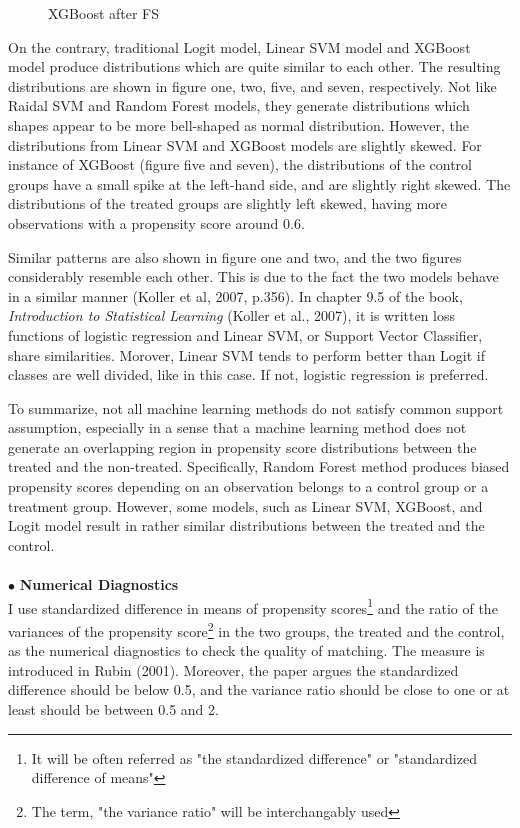 \documentclass[11pt,a4paper,oneside]{article}
\begin{document}
\begin{figure}[!t]
        \caption{XGBoost after FS}\label{fig:histogram7}
    \endminipage
\end{figure}

\par
On the contrary, traditional Logit model, Linear SVM model and XGBoost model produce distributions which are quite similar to each other. The resulting distributions are shown in figure one, two, five, and seven, respectively. Not like Raidal SVM and Random Forest models, they generate distributions which shapes appear to be more bell-shaped as normal distribution. However, the distributions from Linear SVM and XGBoost models are slightly skewed. For instance of XGBoost (figure five and seven), the distributions of the control groups have a small spike at the left-hand side, and are slightly right skewed. The distributions of the treated groups are slightly left skewed, having more observations with a  propensity score around 0.6. 
\par
Similar patterns are also shown in figure one and two, and the two figures considerably resemble each other. This is due to the fact the two models behave in a similar manner (Koller et al, 2007, p.356).\cite{koller2007introduction} In chapter 9.5 of the book, \emph{Introduction to Statistical Learning} (Koller et al., 2007)\cite{koller2007introduction}, it is written loss functions of logistic regression and Linear SVM, or Support Vector Classifier, share similarities. Morover, Linear SVM tends to perform better than Logit if classes are well divided, like in this case. If not, logistic regression is preferred.
\par
To summarize, not all machine learning methods do not satisfy common support assumption, especially in a sense that a machine learning method does not generate an overlapping region in propensity score distributions between the treated and the non-treated. Specifically, Random Forest method produces biased propensity scores depending on an observation belongs to a control group or a treatment group. However, some models, such as Linear SVM, XGBoost, and Logit model result in rather similar distributions between the treated and the control.
\\\\
$\bullet$ \textbf{Numerical Diagnostics}\\
I use standardized difference in means of propensity scores\footnote{It will be often referred as "the standardized difference" or "standardized difference of means"} and the ratio of the variances of the propensity score\footnote{The term, "the variance ratio" will be interchangably used} in the two groups, the treated and the control, as the numerical diagnostics to check the quality of matching. The measure is introduced in Rubin (2001).\cite{rubin2001using} Moreover, the paper argues the standardized difference should be below 0.5, and the variance ratio should be close to one or at least should be between 0.5 and 2. 
\end{document}
